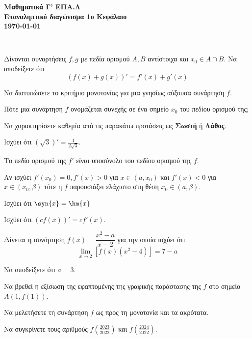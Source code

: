 \documentclass[11pt,a4paper]{article}
\newcommand{\kerkissans}[1]{{\fontfamily{maksf}\selectfont \textbf{#1}}}
\begin{document}
\begin{center}
{\LARGE \kerkissans{Μαθηματικά Γ' ΕΠΑ.Λ}}\\
{\large \kerkissans{Επαναληπτικό διαγώνισμα 1ο Κεφάλαιο\\\today}}
\end{center}
\begin{thema}
\item\mbox{}\\\vspace{-5mm}
\begin{erwthma}
\item Δίνονται συναρτήσεις $f,g$ με πεδία ορισμού $A,Β$ αντίστοιχα και $x_0\in A\cap B$. Να αποδείξετε ότι \[ \left(f(x)+g(x)\right)'=f'(x)+g'(x) \]
\item Να διατυπώσετε το κριτήριο μονοτονίας για μια γνησίως αύξουσα συνάρτηση $f$.
\item Πότε μια συνάρτηση $f$ ονομάζεται συνεχής σε ένα σημείο $x_0$ του πεδίου ορισμού της;
\item Να χαρακτηρίσετε καθεμία από τις παρακάτω προτάσεις ως \textbf{Σωστή} ή \textbf{Λάθος}.
\begin{alist}
\item Ισχύει ότι $ (\sqrt{3})'=\frac{1}{2\sqrt{3}} $.
\item Το πεδίο ορισμού της $ f' $ είναι υποσύνολο του πεδίου ορισμού της $ f $.
\item Αν ισχύει $f'(x_0)=0, f'(x)>0 $ για $x\in(a,x_0)$ και $f'(x)<0$ για $x\in(x_0,\beta)$ τότε η $f$ παρουσιάζει ελάχιστο στη θέση $x_0\in(a,\beta)$.
\item Ισχύει ότι $ \syn{x}=\hm{x} $
\item Ισχύει ότι $ (cf(x))'=cf'(x) $.
\end{alist}
\end{erwthma}
\item Δίνεται η συνάρτηση $f(x)=\dfrac{x^2-a}{x-2}$ για την οποία ισχύει ότι 
\[ \lim_{x\to 2}{\left[f(x)(x^2-4)\right]}=7-a \]
\begin{erwthma}
\item Να αποδείξετε ότι $ a=3 $.
\item Να βρεθεί η εξίσωση της εφαπτομένης της γραφικής παράστασης της $f$ στο σημείο $A(1,f(1))$.
\item Να μελετήσετε τη συνάρτηση $f$ ως προς τη μονοτονία και τα ακρότατα.
\item Να συγκρίνετε τους αριθμούς $f\left(\frac{2023}{2022}\right)$ και $f\left(\frac{2024}{2022}\right)$.
\end{erwthma}

\end{thema}
\end{document}
